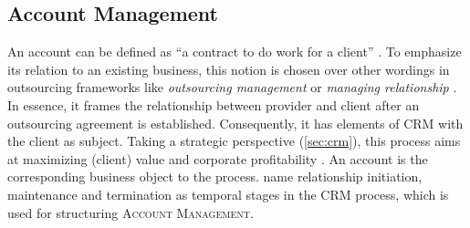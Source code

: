 	
	
	
	
	\subsection{Account Management}
	
	An account can be defined as \enquote{a contract to do work for a client} \citep{oxfordaccount}. To emphasize its relation to an existing business, this notion is chosen over other wordings in outsourcing frameworks like \textit{outsourcing management} \citep{Franceschini_2003} or \textit{managing relationship} \citep{perunovic2007outsourcing}. In essence, it frames the relationship between provider and client after an outsourcing agreement is established. Consequently, it has elements of \acrshort{CRM} with the client as subject. Taking a strategic perspective (\cf \ref{sec:crm}), this process aims at maximizing (client) value and corporate profitability \citep{payne2004role}. An account is the corresponding business object to the process. \cite{reinartz2004customer} name relationship initiation, maintenance and termination as temporal stages in the \acrshort{CRM} process, which is used for structuring \textsc{Account Management}.
	
